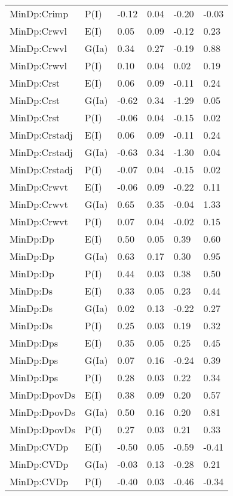 \begin{center}
\begin{longtable}{|p{1.1in}|p{0.7in}|p{0.7in}|p{0.6in}|p{0.6in}|p{0.6in}|}
  MinDp:Crimp & P(I) & -0.12 & 0.04 & -0.20 & -0.03 \\ 
  MinDp:Crwvl & E(I) & 0.05 & 0.09 & -0.12 & 0.23 \\ 
  MinDp:Crwvl & G(Ia) & 0.34 & 0.27 & -0.19 & 0.88 \\ 
  MinDp:Crwvl & P(I) & 0.10 & 0.04 & 0.02 & 0.19 \\ 
  MinDp:Crst & E(I) & 0.06 & 0.09 & -0.11 & 0.24 \\ 
  MinDp:Crst & G(Ia) & -0.62 & 0.34 & -1.29 & 0.05 \\ 
  MinDp:Crst & P(I) & -0.06 & 0.04 & -0.15 & 0.02 \\ 
  MinDp:Crstadj & E(I) & 0.06 & 0.09 & -0.11 & 0.24 \\ 
  MinDp:Crstadj & G(Ia) & -0.63 & 0.34 & -1.30 & 0.04 \\ 
  MinDp:Crstadj & P(I) & -0.07 & 0.04 & -0.15 & 0.02 \\ 
  MinDp:Crwvt & E(I) & -0.06 & 0.09 & -0.22 & 0.11 \\ 
  MinDp:Crwvt & G(Ia) & 0.65 & 0.35 & -0.04 & 1.33 \\ 
  MinDp:Crwvt & P(I) & 0.07 & 0.04 & -0.02 & 0.15 \\ 
  MinDp:Dp & E(I) & 0.50 & 0.05 & 0.39 & 0.60 \\ 
  MinDp:Dp & G(Ia) & 0.63 & 0.17 & 0.30 & 0.95 \\ 
  MinDp:Dp & P(I) & 0.44 & 0.03 & 0.38 & 0.50 \\ 
  MinDp:Ds & E(I) & 0.33 & 0.05 & 0.23 & 0.44 \\ 
  MinDp:Ds & G(Ia) & 0.02 & 0.13 & -0.22 & 0.27 \\ 
  MinDp:Ds & P(I) & 0.25 & 0.03 & 0.19 & 0.32 \\ 
  MinDp:Dps & E(I) & 0.35 & 0.05 & 0.25 & 0.45 \\ 
  MinDp:Dps & G(Ia) & 0.07 & 0.16 & -0.24 & 0.39 \\ 
  MinDp:Dps & P(I) & 0.28 & 0.03 & 0.22 & 0.34 \\ 
  MinDp:DpovDs & E(I) & 0.38 & 0.09 & 0.20 & 0.57 \\ 
  MinDp:DpovDs & G(Ia) & 0.50 & 0.16 & 0.20 & 0.81 \\ 
  MinDp:DpovDs & P(I) & 0.27 & 0.03 & 0.21 & 0.33 \\ 
  MinDp:CVDp & E(I) & -0.50 & 0.05 & -0.59 & -0.41 \\ 
  MinDp:CVDp & G(Ia) & -0.03 & 0.13 & -0.28 & 0.21 \\ 
  MinDp:CVDp & P(I) & -0.40 & 0.03 & -0.46 & -0.34 \\ 

\end{longtable}
\end{center}
